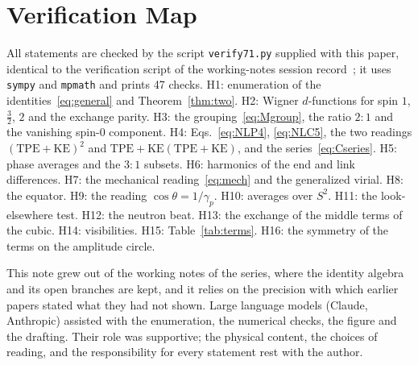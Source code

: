 \documentclass[%
 reprint, amsmath,amssymb, aps, prb, ]{revtex4-2}
\numberwithin{equation}{section}
\begin{document}
\appendix

\section{Verification Map}
\label{app:verify}

All statements are checked by the script \texttt{verify71.py} supplied with this paper, identical to the verification script of the working-notes session record~\cite{ref:session}; it uses \texttt{sympy} and \texttt{mpmath} and prints 47 checks. H1: enumeration of the identities~\eqref{eq:general} and Theorem~\ref{thm:two}. H2: Wigner $d$-functions for spin $1$, $\frac32$, $2$ and the exchange parity. H3: the grouping~\eqref{eq:Mgroup}, the ratio $2{:}1$ and the vanishing spin-0 component. H4: Eqs.~\eqref{eq:NLP4}, \eqref{eq:NLC5}, the two readings $(\mathrm{TPE}+\mathrm{KE})^2$ and $\mathrm{TPE}+\mathrm{KE}(\mathrm{TPE}+\mathrm{KE})$, and the series~\eqref{eq:Cseries}. H5: phase averages and the $3{:}1$ subsets. H6: harmonics of the end and link differences. H7: the mechanical reading~\eqref{eq:mech} and the generalized virial. H8: the equator. H9: the reading $\cos\theta=1/\gamma_p$. H10: averages over $S^2$. H11: the look-elsewhere test. H12: the neutron beat. H13: the exchange of the middle terms of the cubic. H14: visibilities. H15: Table~\ref{tab:terms}. H16: the symmetry of the terms on the amplitude circle.

\begin{acknowledgments}
This note grew out of the working notes of the series, where the identity algebra and its open branches are kept, and it relies on the precision with which earlier papers stated what they had not shown. Large language models (Claude, Anthropic) assisted with the enumeration, the numerical checks, the figure and the drafting. Their role was supportive; the physical content, the choices of reading, and the responsibility for every statement rest with the author.
\end{acknowledgments}
\end{document}
